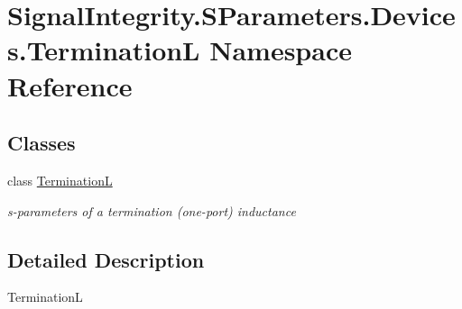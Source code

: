 \hypertarget{namespaceSignalIntegrity_1_1SParameters_1_1Devices_1_1TerminationL}{}\section{Signal\+Integrity.\+S\+Parameters.\+Devices.\+TerminationL Namespace Reference}
\label{namespaceSignalIntegrity_1_1SParameters_1_1Devices_1_1TerminationL}
\subsection*{Classes}
\begin{DoxyCompactItemize}
\item 
class \hyperlink{classSignalIntegrity_1_1SParameters_1_1Devices_1_1TerminationL_1_1TerminationL}{TerminationL}
\begin{DoxyCompactList}\small\item\em s-\/parameters of a termination (one-\/port) inductance \end{DoxyCompactList}\end{DoxyCompactItemize}


\subsection{Detailed Description}
\begin{DoxyVerb}TerminationL\end{DoxyVerb}
 